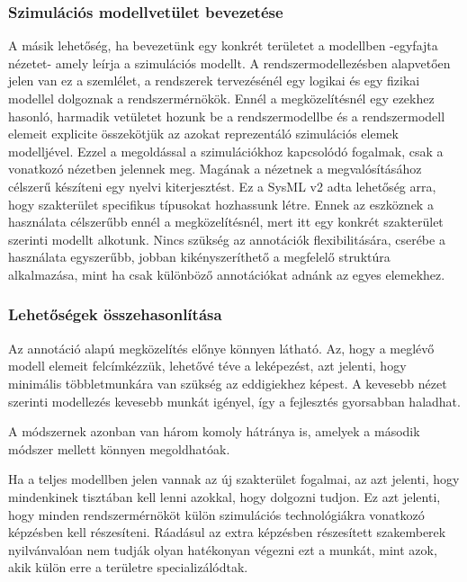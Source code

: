         \subsubsection{Szimulációs modellvetület bevezetése}
        A másik lehetőség, ha bevezetünk egy konkrét területet a modellben -egyfajta nézetet- amely leírja a szimulációs modellt.
        A rendszermodellezésben alapvetően jelen van ez a szemlélet, a rendszerek tervezésénél egy logikai és egy fizikai modellel dolgoznak a rendszermérnökök.
        Ennél a megközelítésnél egy ezekhez hasonló, harmadik vetületet hozunk be a rendszermodellbe és a rendszermodell elemeit explicite összekötjük az azokat reprezentáló szimulációs elemek modelljével.
        Ezzel a megoldással a szimulációkhoz kapcsolódó fogalmak, csak a vonatkozó nézetben jelennek meg.
        Magának a nézetnek a megvalósításához célszerű készíteni egy nyelvi kiterjesztést.
        Ez a SysML v2 adta lehetőség arra, hogy szakterület specifikus típusokat hozhassunk létre.
        Ennek az eszköznek a használata célszerűbb ennél a megközelítésnél, mert itt egy konkrét szakterület szerinti modellt alkotunk.
        Nincs szükség az annotációk flexibilitására, cserébe a használata egyszerűbb, jobban kikényszeríthető a megfelelő struktúra alkalmazása, mint ha csak különböző annotációkat adnánk az egyes elemekhez.

        \subsubsection{Lehetőségek összehasonlítása}
        Az annotáció alapú megközelítés előnye könnyen látható. Az, hogy a meglévő modell elemeit felcímkézzük, lehetővé téve a leképezést, azt jelenti, hogy minimális többletmunkára van szükség az eddigiekhez képest.
        A kevesebb nézet szerinti modellezés kevesebb munkát igényel, így a fejlesztés gyorsabban haladhat.
        
        A módszernek azonban van három komoly hátránya is, amelyek a második módszer mellett könnyen megoldhatóak.

        Ha a teljes modellben jelen vannak az új szakterület fogalmai, az azt jelenti, hogy mindenkinek tisztában kell lenni azokkal, hogy dolgozni tudjon.
        Ez azt jelenti, hogy minden rendszermérnököt külön szimulációs technológiákra vonatkozó képzésben kell részesíteni.
        Ráadásul az extra képzésben részesített szakemberek nyilvánvalóan nem tudják olyan hatékonyan végezni ezt a munkát, mint azok, akik külön erre a területre specializálódtak.

